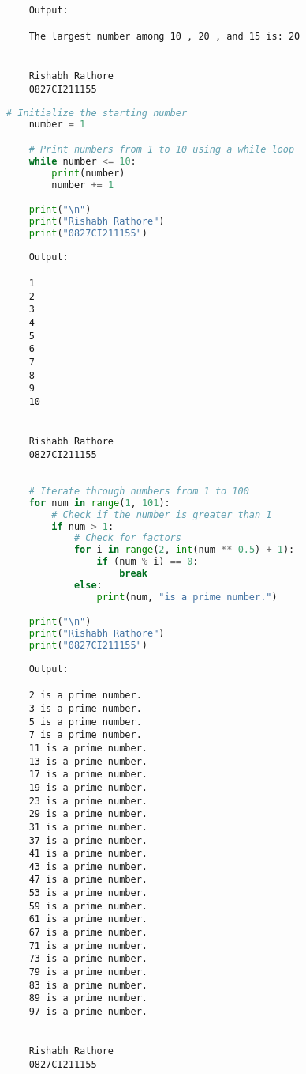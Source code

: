 \documentclass{report}
\begin{document}
\begin{verbatim}
	Output:

	The largest number among 10 , 20 , and 15 is: 20


	Rishabh Rathore
	0827CI211155
\end{verbatim}
\bigskip


\sol{}
\begin{lstlisting}[language=Python]
	# Initialize the starting number
	number = 1

	# Print numbers from 1 to 10 using a while loop
	while number <= 10:
		print(number)
		number += 1

	print("\n")
	print("Rishabh Rathore")
	print("0827CI211155")

\end{lstlisting}

\begin{verbatim}
	Output:

	1
	2
	3
	4
	5
	6
	7
	8
	9
	10
	
	
	Rishabh Rathore
	0827CI211155
\end{verbatim}
\bigskip


\sol{}
\begin{lstlisting}[language=Python]

	# Iterate through numbers from 1 to 100
	for num in range(1, 101):
		# Check if the number is greater than 1
		if num > 1:
			# Check for factors
			for i in range(2, int(num ** 0.5) + 1):
				if (num % i) == 0:
					break
			else:
				print(num, "is a prime number.")

	print("\n")
	print("Rishabh Rathore")
	print("0827CI211155")
\end{lstlisting}

\begin{verbatim}
	Output:

	2 is a prime number.
	3 is a prime number.
	5 is a prime number.
	7 is a prime number.
	11 is a prime number.
	13 is a prime number.
	17 is a prime number.
	19 is a prime number.
	23 is a prime number.
	29 is a prime number.
	31 is a prime number.
	37 is a prime number.
	41 is a prime number.
	43 is a prime number.
	47 is a prime number.
	53 is a prime number.
	59 is a prime number.
	61 is a prime number.
	67 is a prime number.
	71 is a prime number.
	73 is a prime number.
	79 is a prime number.
	83 is a prime number.
	89 is a prime number.
	97 is a prime number.
	
	
	Rishabh Rathore
	0827CI211155
\end{verbatim}
\bigskip
\end{document}
